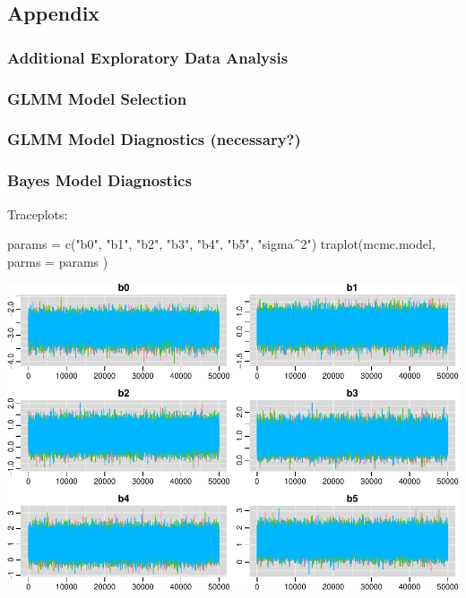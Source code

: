 \documentclass[
]{article}
\newenvironment{Shaded}{\begin{snugshade}}{\end{snugshade}}
\newcommand{\AttributeTok}[1]{\textcolor[rgb]{0.77,0.63,0.00}{#1}}
\newcommand{\FunctionTok}[1]{\textcolor[rgb]{0.00,0.00,0.00}{#1}}
\newcommand{\NormalTok}[1]{#1}
\newcommand{\OtherTok}[1]{\textcolor[rgb]{0.56,0.35,0.01}{#1}}
\newcommand{\StringTok}[1]{\textcolor[rgb]{0.31,0.60,0.02}{#1}}
\begin{document}
\hypertarget{appendix}{%
\subsection{Appendix}\label{appendix}}

\hypertarget{additional-exploratory-data-analysis}{%
\subsubsection{Additional Exploratory Data
Analysis}\label{additional-exploratory-data-analysis}}

\hypertarget{glmm-model-selection}{%
\subsubsection{GLMM Model Selection}\label{glmm-model-selection}}

\hypertarget{glmm-model-diagnostics-necessary}{%
\subsubsection{GLMM Model Diagnostics
(necessary?)}\label{glmm-model-diagnostics-necessary}}

\hypertarget{bayes-model-diagnostics}{%
\subsubsection{Bayes Model Diagnostics}\label{bayes-model-diagnostics}}

Traceplots:

\begin{Shaded}
\begin{Highlighting}[]
\NormalTok{params }\OtherTok{=} \FunctionTok{c}\NormalTok{(}\StringTok{"b0"}\NormalTok{, }\StringTok{"b1"}\NormalTok{, }\StringTok{"b2"}\NormalTok{, }\StringTok{"b3"}\NormalTok{, }\StringTok{"b4"}\NormalTok{, }\StringTok{"b5"}\NormalTok{, }\StringTok{"sigma\^{}2"}\NormalTok{)}
\FunctionTok{traplot}\NormalTok{(mcmc.model, }\AttributeTok{parms =}\NormalTok{ params )}
\end{Highlighting}
\end{Shaded}

\includegraphics{final_report_files/figure-latex/trace-1.pdf}
\end{document}
